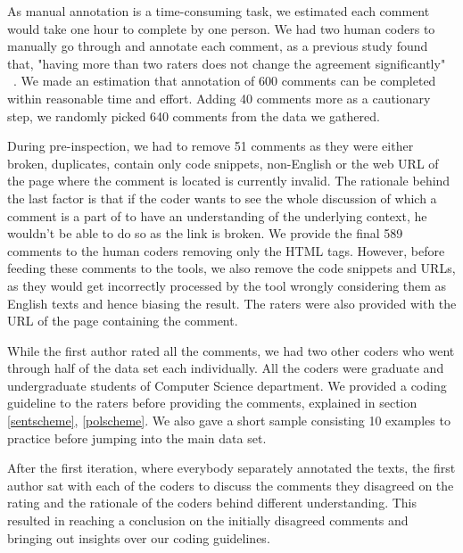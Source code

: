 As manual annotation is a time-consuming task, we estimated each comment would take one hour to complete by one person. We had two human coders to manually go through and annotate each comment, as a previous study found that, "having more than two raters does not change the agreement significantly" ~\cite{murgia2014developers}. We made an estimation that annotation of 600 comments can be completed within reasonable time and effort. Adding 40 comments more as a cautionary step, we randomly picked 640 comments from the data we gathered.

During pre-inspection, we had to remove 51 comments as they were either broken, duplicates, contain only code snippets, non-English or the web URL of the page where the comment is located is currently invalid. The rationale behind the last factor is that if the coder wants to see the whole discussion of which a comment is a part of to have an understanding of the underlying context, he wouldn't be able to do so as the link is broken. We provide the final 589 comments to the human coders removing only the HTML tags. However, before feeding these comments to the tools, we also remove the code snippets and URLs, as they would get incorrectly processed by the tool wrongly considering them as English texts and hence biasing the result. The raters were also provided with the URL of the page containing the comment.

While the first author rated all the comments, we had two other coders who went through half of the data set each individually. All the coders were graduate and undergraduate students of Computer Science department. We provided a coding guideline to the raters before providing the comments, explained in section \ref{sentscheme}, \ref{polscheme}. We also gave a short sample consisting 10 examples to practice before jumping into the main data set.

After the first iteration, where everybody separately annotated the texts, the first author sat with each of the coders to discuss the comments they disagreed on the rating and the rationale of the coders behind different understanding. This resulted in reaching a conclusion on the initially disagreed comments and bringing out insights over our coding guidelines.

